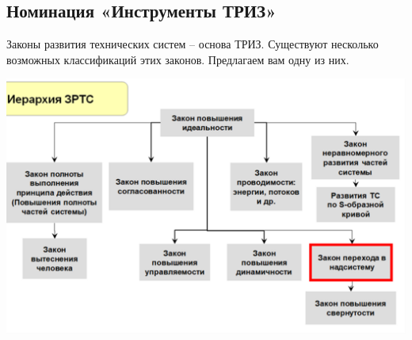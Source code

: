 \documentclass[11pt,a4paper]{article}
\begin{document}
\subsection*{Номинация «Инструменты ТРИЗ»}

Законы развития технических систем – основа ТРИЗ. Существуют несколько
возможных классификаций этих законов. Предлагаем вам одну из них.
\begin{center}
  \includegraphics[width=.9\textwidth]{oE4yUs.png}
\end{center}
\end{document}
